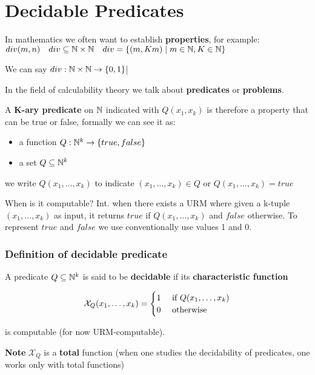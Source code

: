 \chapter{Decidable Predicates}

In mathematics we often want to establish \textbf{properties}, for example: $ div(m,n)  \quad  div \subseteq \mathbb{N} \times \mathbb{N} \quad  div = \{(m,Km) \mid m \in \mathbb{N}, K \in \mathbb{N} \} $

We can say $ div: \mathbb{N} \times \mathbb{N} \rightarrow \{0,1\} $|

In the field of calculability theory we talk about \textbf{predicates} or \textbf{problems}.

A \textbf{K-ary predicate} on $\mathbb{N} $ indicated with $Q(x_1,x_k)$ is therefore a property that can be true or false, formally we can see it as:

\begin{itemize}
\item a function $Q: \mathbb{N}^k\rightarrow \{true,false\}$
\item a set $Q \subseteq \mathbb{N}^k$
\end{itemize}

we write $Q(x_1,\dots,x_k)$ to indicate $(x_1,\dots,x_k) \in Q$ or $Q(x_1,\dots,x_k) = true$

When is it computable? Int. when there exists a URM where given a k-tuple $(x_1,\dots,x_k)$ as input, it returns $true$ if $Q(x_1,\dots,x_k)$ and $false$ otherwise. To represent $true$ and $false$ we use conventionally use values 1 and 0.

\subsection{Definition of decidable predicate}

A predicate $Q \subseteq \mathbb{N}^k$ is said to be \textbf{decidable} if its \textbf{characteristic function}

\begin{equation*}
\mathcal{X}_Q(x_1,\dots,x_k) = \begin{cases}
1 & $ if $ Q(x_1,\dots,x_k) \\
0 & $ otherwise $
\end{cases}
\end{equation*}

is computable (for now URM-computable).

\textbf{Note} $\mathcal{X}_Q$ is a \textbf{total} function (when one studies the decidability of predicates, one works only with total functions)

